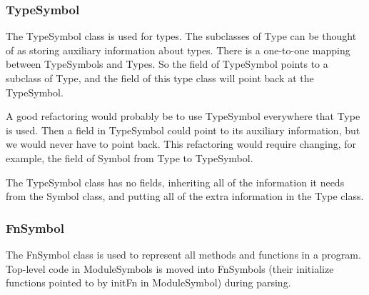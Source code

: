 \documentclass[10pt]{article}
\begin{document}
\subsubsection{TypeSymbol}
\label{sec:typesymbol}

The TypeSymbol class is used for types.  The subclasses of Type can be
thought of as storing auxiliary information about types.  There is a
one-to-one mapping between TypeSymbols and Types.  So the 
field of TypeSymbol points to a subclass of Type, and the 
field of this type class will point back at the TypeSymbol.

A good refactoring would probably be to use TypeSymbol everywhere that
Type is used.  Then a field in TypeSymbol could point to its auxiliary
information, but we would never have to point back.  This refactoring
would require changing, for example, the  field of Symbol
from Type to TypeSymbol.

The TypeSymbol class has no fields, inheriting all of the information
it needs from the Symbol class, and putting all of the extra
information in the Type class.

\subsubsection{FnSymbol}
\label{sec:fnsymbol}

The FnSymbol class is used to represent all methods and functions in a
program.  Top-level code in ModuleSymbols is moved into FnSymbols
(their initialize functions pointed to by initFn in ModuleSymbol)
during parsing.
\end{document}
